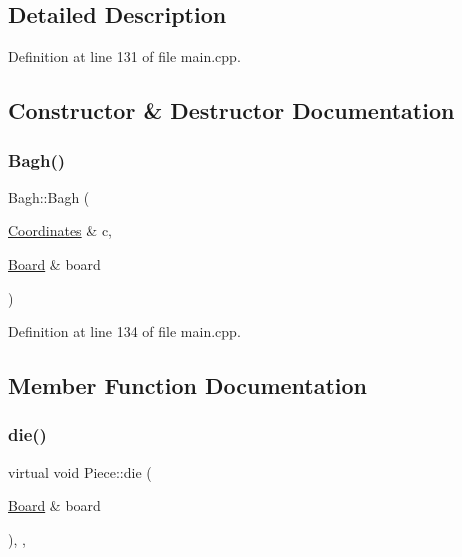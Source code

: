 \subsection{Detailed Description}


Definition at line 131 of file main.\+cpp.



\subsection{Constructor \& Destructor Documentation}
\mbox{\label{class_bagh_a0fb9fd6062c5eaf058b0ea6bf0d53336}} 
\subsubsection{\texorpdfstring{Bagh()}{Bagh()}}
{\footnotesize\ttfamily Bagh\+::\+Bagh (\begin{DoxyParamCaption}\item[{\mbox{\hyperlink{class_coordinates}{Coordinates}} \&}]{c,  }\item[{\mbox{\hyperlink{class_board}{Board}} \&}]{board }\end{DoxyParamCaption})\hspace{0.3cm}{\ttfamily [inline]}}



Definition at line 134 of file main.\+cpp.



\subsection{Member Function Documentation}
\mbox{\label{class_piece_a2f3261b1482b5635b6aa0bf67c588b98}} 
\subsubsection{\texorpdfstring{die()}{die()}}
{\footnotesize\ttfamily virtual void Piece\+::die (\begin{DoxyParamCaption}\item[{\mbox{\hyperlink{class_board}{Board}} \&}]{board }\end{DoxyParamCaption})\hspace{0.3cm}{\ttfamily [inline]}, {\ttfamily [virtual]}, {\ttfamily [inherited]}}



